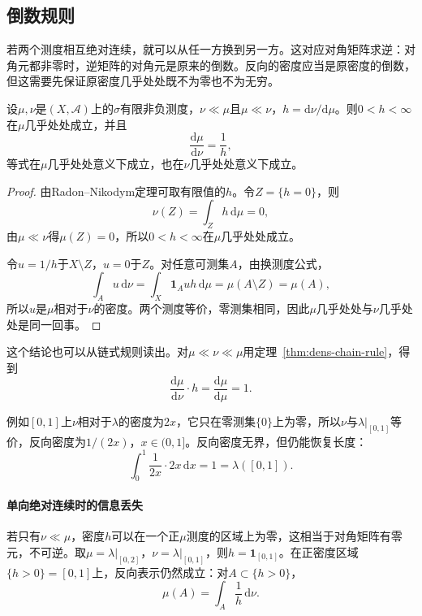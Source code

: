 \subsection{倒数规则}
\label{sec:dens-inverse-rule}

若两个测度相互绝对连续，就可以从任一方换到另一方。这对应对角矩阵求逆：对角元都非零时，逆矩阵的对角元是原来的倒数。反向的密度应当是原密度的倒数，但这需要先保证原密度几乎处处既不为零也不为无穷。

\begin{theorem}[密度的倒数]
\label{thm:dens-inverse}
设$\mu,\nu$是$(X,\mathcal A)$上的$\sigma$有限非负测度，$\nu\ll\mu$且$\mu\ll\nu$，$h=\mathrm d\nu/\mathrm d\mu$。则$0<h<\infty$在$\mu$几乎处处成立，并且
\begin{equation}
\frac{\mathrm d\mu}{\mathrm d\nu}=\frac1h ,
\label{eq:dens-inverse}
\end{equation}
等式在$\mu$几乎处处意义下成立，也在$\nu$几乎处处意义下成立。
\end{theorem}

\begin{proof}
由Radon–Nikodym定理可取有限值的$h$。令$Z=\{h=0\}$，则
\[
\nu(Z)=\int_Zh\,\mathrm d\mu=0 ,
\]
由$\mu\ll\nu$得$\mu(Z)=0$，所以$0<h<\infty$在$\mu$几乎处处成立。

令$u=1/h$于$X\setminus Z$，$u=0$于$Z$。对任意可测集$A$，由换测度公式，
\[
\int_Au\,\mathrm d\nu=\int_X\mathbf 1_Auh\,\mathrm d\mu=\mu(A\setminus Z)=\mu(A),
\]
所以$u$是$\mu$相对于$\nu$的密度。两个测度等价，零测集相同，因此$\mu$几乎处处与$\nu$几乎处处是同一回事。
\end{proof}

这个结论也可以从链式规则读出。对$\mu\ll\nu\ll\mu$用定理~\ref{thm:dens-chain-rule}，得到
\[
\frac{\mathrm d\mu}{\mathrm d\nu}\cdot h=\frac{\mathrm d\mu}{\mathrm d\mu}=1 .
\]

例如$[0,1]$上$\nu$相对于$\lambda$的密度为$2x$，它只在零测集$\{0\}$上为零，所以$\nu$与$\lambda|_{[0,1]}$等价，反向密度为$1/(2x)$，$x\in(0,1]$。反向密度无界，但仍能恢复长度：
\[
\int_0^1\frac1{2x}\cdot2x\,\mathrm dx=1=\lambda([0,1]).
\]

\paragraph{单向绝对连续时的信息丢失}
若只有$\nu\ll\mu$，密度$h$可以在一个正$\mu$测度的区域上为零，这相当于对角矩阵有零元，不可逆。取$\mu=\lambda|_{[0,2]}$，$\nu=\lambda|_{[0,1]}$，则$h=\mathbf 1_{[0,1]}$。在正密度区域$\{h>0\}=[0,1]$上，反向表示仍然成立：对$A\subset\{h>0\}$，
\[
\mu(A)=\int_A\frac1h\,\mathrm d\nu .
\]


